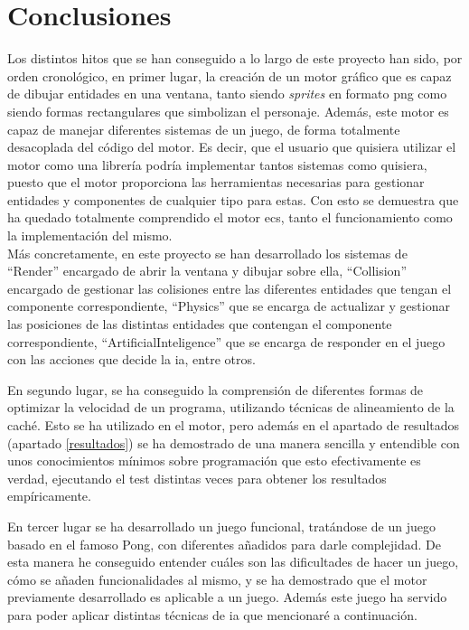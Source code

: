 
\chapter{Conclusiones}
\label{conclusiones}
Los distintos hitos que se han conseguido a lo largo de este proyecto han sido, por orden cronológico, en primer lugar, la creación de un motor gráfico que es capaz de dibujar entidades en una ventana, tanto siendo \textit{sprites} en formato \gls{png} como siendo formas rectangulares que simbolizan el personaje. Además, este motor es capaz de manejar diferentes sistemas de un juego, de forma totalmente desacoplada del código del motor. Es decir, que el usuario que quisiera utilizar el motor como una librería podría implementar tantos sistemas como quisiera, puesto que el motor proporciona las herramientas necesarias para gestionar entidades y componentes de cualquier tipo para estas. Con esto se demuestra que ha quedado totalmente comprendido el motor \gls{ecs}, tanto el funcionamiento como la implementación del mismo. 
\\
Más concretamente, en este proyecto se han desarrollado los sistemas de ``Render'' encargado de abrir la ventana y dibujar sobre ella, ``Collision''  encargado de gestionar las colisiones entre las diferentes entidades que tengan el componente correspondiente, ``Physics'' que se encarga de actualizar y gestionar las posiciones de las distintas entidades que contengan el componente correspondiente, ``ArtificialInteligence'' que se encarga de responder en el juego con las acciones que decide la \gls{ia}, entre otros.

En segundo lugar, se ha conseguido la comprensión de diferentes formas de optimizar la velocidad de un programa, utilizando técnicas de alineamiento de la caché. Esto se ha utilizado en el motor, pero además en el apartado de resultados (apartado \ref{resultados}) se ha demostrado de una manera sencilla y entendible con unos conocimientos mínimos sobre programación que esto efectivamente es verdad, ejecutando el test distintas veces para obtener los resultados empíricamente.

En tercer lugar se ha desarrollado un juego funcional, tratándose de un juego basado en el famoso Pong, con diferentes añadidos para darle complejidad. De esta manera he conseguido entender cuáles son las dificultades de hacer un juego, cómo se añaden funcionalidades al mismo, y se ha demostrado que el motor previamente desarrollado es aplicable a un juego. Además este juego ha servido para poder aplicar distintas técnicas de \gls{ia} que mencionaré a continuación.

